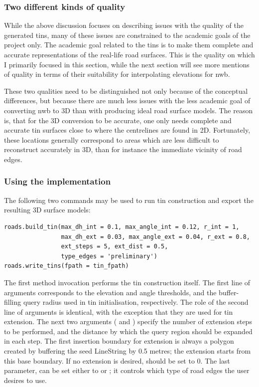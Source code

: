 \subsubsection{Two different kinds of quality}

While the above discussion focuses on describing issues with the quality of the generated \ac{tin}s, many of these issues are constrained to the academic goals of the project only. The academic goal related to the \ac{tin}s is to make them complete and accurate representations of the real-life road surfaces. This is the quality on which I primarily focused in this section, while the next section will see more mentions of quality in terms of their suitability for interpolating elevations for \ac{nwb}.

These two qualities need to be distinguished not only because of the conceptual differences, but because there are much less issues with the less academic goal of converting \ac{nwb} to 3D than with producing ideal road surface models. The reason is, that for the 3D conversion to be accurate, one only needs complete and accurate \ac{tin} surfaces close to where the centrelines are found in 2D. Fortunately, these locations generally correspond to areas which are less difficult to reconstruct accurately in 3D, than for instance the immediate vicinity of road edges.

\subsubsection{Using the implementation}

The following two commands may be used to run \ac{tin} construction and export the resulting 3D surface models:

\begin{verbatim}
roads.build_tin(max_dh_int = 0.1, max_angle_int = 0.12, r_int = 1,
                max_dh_ext = 0.03, max_angle_ext = 0.04, r_ext = 0.8,
                ext_steps = 5, ext_dist = 0.5,
                type_edges = 'preliminary')
roads.write_tins(fpath = tin_fpath)
\end{verbatim}

The first method invocation performs the \ac{tin} construction itself. The first line of arguments corresponds to the elevation and angle thresholds, and the buffer-filling query radius used in \ac{tin} initialisation, respectively. The role of the second line of arguments is identical, with the exception that they are used for \ac{tin} extension. The next two arguments ( and ) specify the number of extension steps to be performed, and the distance by which the query region should be expanded in each step. The first insertion boundary for extension is always a polygon created by buffering the seed LineString by 0.5 metres; the extension starts from this base boundary. If no extension is desired,  should be set to 0. The last parameter,  can be set either to  or ; it controls which type of road edges the user desires to use.

